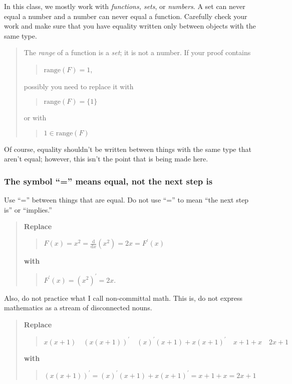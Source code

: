 \documentclass[12pt]{article}
\newcounter{ex}\setcounter{ex}{0}
\newcounter{se}\setcounter{se}{0}
\begin{document}
In this class, we mostly work with {\em functions, sets}, or {\em
numbers\/}.  A set can never equal a number and a number can never
equal a function.  Carefully check your work and make sure that you
have equality written only between objects with the same type.
\begin{quote}
The \emph{range} of a function is a \emph{set}; it is not a
number. If your proof contains
\begin{quote}
 \(\mbox{range}(F) = 1\),
\end{quote}
possibly you need to replace it with
\begin{quote}
 \(\mbox{range}(F) = \{1\}\)
\end{quote}
or with
\begin{quote}
 \(1 \in \mbox{range}(F)\)
\end{quote}
\end{quote}
Of course, equality shouldn't be written between things with the
same type that aren't equal; however, this isn't the point that 
is being made here.


 \subsubsection{ The symbol ``='' means equal, not the next step is}

Use ``='' between things that are equal. Do not use ``='' to  mean ``the next step is'' or ``implies.''

\begin{quote}
\textbf{Replace}
\begin{quote}
  \(\displaystyle F(x) = x^2 = \frac{\mathrm{d}}{\mathrm{d} x} (x^2) = 2x = F^\prime(x)\)
\end{quote}
\textbf{with}
\begin{quote}
  \(F^\prime(x) = (x^2)^\prime = 2 x. \)
\end{quote}
\end{quote}

\noindent Also, do not practice what I call non-committal math. This is, do not
express mathematics as a stream of disconnected nouns.

\begin{quote}
\textbf{Replace}
\begin{quote}
  \( x (x + 1) \quad (x (x + 1))^\prime \quad (x)^\prime (x + 1) + x (x+1)^\prime
 \quad x + 1 + x \quad 2x + 1 \)
\end{quote}
\textbf{with}
\begin{quote}
   \((x (x + 1))^\prime = (x)^\prime (x + 1) + x (x+1)^\prime =  x + 1 + x = 2x + 1 \)
\end{quote}
\end{quote}
\end{document}
